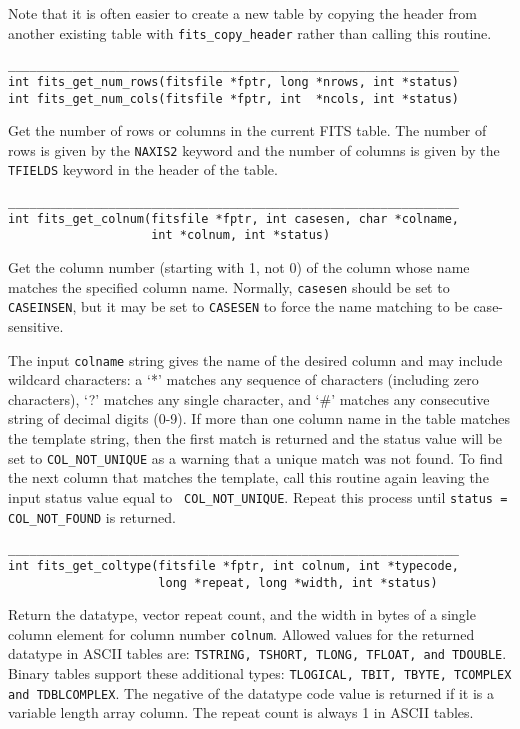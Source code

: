 \documentclass[11pt]{article}
\begin{document}
Note that it is often easier to create a new table by copying the
header from another existing table with {\tt fits\_copy\_header} rather
than calling this routine.

\begin{verbatim}
_______________________________________________________________
int fits_get_num_rows(fitsfile *fptr, long *nrows, int *status)
int fits_get_num_cols(fitsfile *fptr, int  *ncols, int *status)
\end{verbatim}

Get the number of rows or columns in the current FITS table.  The
number of rows is given by the {\tt NAXIS2} keyword and the number of columns
is given by the {\tt TFIELDS} keyword in the header of the table.

\begin{verbatim}
_______________________________________________________________
int fits_get_colnum(fitsfile *fptr, int casesen, char *colname,
                    int *colnum, int *status)
\end{verbatim}

Get the  column number (starting with 1, not 0) of the column whose
name matches the specified column name.   Normally, {\tt casesen} should
be set to {\tt CASEINSEN}, but it may be set to {\tt CASESEN} to force
the name matching to be case-sensitive.

The input {\tt colname} string gives the name of the desired column and
may include wildcard characters:  a `*' matches any sequence of
characters (including zero characters), `?' matches any single
character, and `\#' matches any consecutive string of decimal digits
(0-9).  If more than one column name in the table matches the template
string, then the first match is returned and the status value will be
set to {\tt COL\_NOT\_UNIQUE}  as a warning that a unique match was not
found.  To find the next column that matches the template, call this
routine again leaving the input status value equal to {\tt
COL\_NOT\_UNIQUE}.  Repeat this process until {\tt status =
COL\_NOT\_FOUND}  is returned.

\begin{verbatim}
_______________________________________________________________
int fits_get_coltype(fitsfile *fptr, int colnum, int *typecode,
                     long *repeat, long *width, int *status)
\end{verbatim}

Return the datatype, vector repeat count, and the width in bytes of a
single column element for column number {\tt colnum}.  Allowed values
for the returned datatype in ASCII tables are:  {\tt TSTRING, TSHORT,
TLONG, TFLOAT, and TDOUBLE}.  Binary tables support these additional
types: {\tt TLOGICAL, TBIT, TBYTE, TCOMPLEX and TDBLCOMPLEX}.  The
negative of the datatype code value is returned if it is a variable
length array column.  The repeat count is always 1 in ASCII tables.
\end{document}
